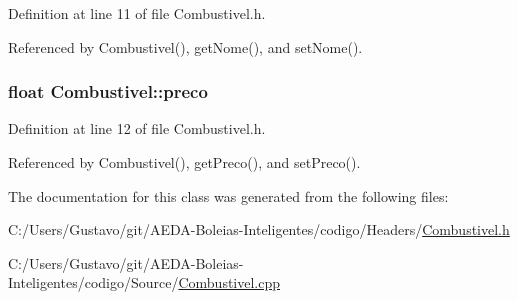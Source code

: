 Definition at line 11 of file Combustivel.\+h.



Referenced by Combustivel(), get\+Nome(), and set\+Nome().

\hypertarget{class_combustivel_ac910a8410930ba553861f584da9f48d1}{
\subsubsection[{preco}]{\setlength{\rightskip}{0pt plus 5cm}float Combustivel\+::preco\hspace{0.3cm}{\ttfamily [private]}}}\label{class_combustivel_ac910a8410930ba553861f584da9f48d1}


Definition at line 12 of file Combustivel.\+h.



Referenced by Combustivel(), get\+Preco(), and set\+Preco().



The documentation for this class was generated from the following files\+:\begin{DoxyCompactItemize}
\item 
C\+:/\+Users/\+Gustavo/git/\+A\+E\+D\+A-\/\+Boleias-\/\+Inteligentes/codigo/\+Headers/\hyperlink{_combustivel_8h}{Combustivel.\+h}\item 
C\+:/\+Users/\+Gustavo/git/\+A\+E\+D\+A-\/\+Boleias-\/\+Inteligentes/codigo/\+Source/\hyperlink{_combustivel_8cpp}{Combustivel.\+cpp}\end{DoxyCompactItemize}

